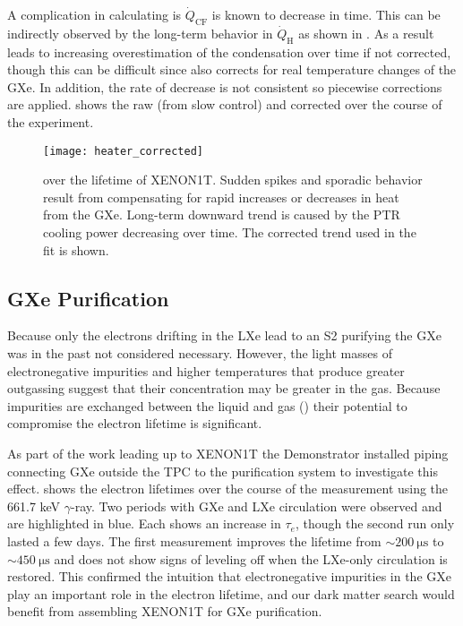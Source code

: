 A complication in calculating \qdg is $\dot{Q}_{\mathrm{CF}}$ is known to decrease in time.  This can be indirectly observed by
the long-term behavior in $\dot{Q}_{\mathrm{H}}$ as shown in .  As a result
 leads to increasing overestimation of the condensation over time if not
corrected, though this can be difficult since \qdh also corrects for real temperature changes of the
GXe.  In addition, the rate of decrease is not consistent so piecewise corrections are
applied.   shows the raw (from slow control) and corrected \qdh over the course of
the experiment.

\begin{figure}
\centering
\texttt{[image: heater\_corrected]}
\caption{\qdh over the lifetime of XENON1T.  Sudden spikes and sporadic behavior result from compensating for rapid increases or decreases
in heat from the GXe.  Long-term downward trend is caused by the PTR cooling power decreasing over time.  The corrected trend
used in the fit is shown.}
\label{fig:electron_lifetime_model_vap_and_cond_heater_all}
\end{figure}



\subsection{GXe Purification}
\label{subsec:electron_lifetime_model_gxe}
Because only the electrons drifting in the LXe lead to an S2 purifying the GXe was in the past not considered necessary.  However,
the light masses of electronegative impurities and higher temperatures that produce greater outgassing
suggest that their concentration may be greater in the gas.  Because
impurities are exchanged between the liquid and gas () their potential to compromise
the electron lifetime is significant.

As part of the work leading up to XENON1T the Demonstrator installed piping connecting GXe outside the TPC to the
purification system to investigate this effect.   shows the electron lifetimes over
the course of the measurement using the 661.7 keV  $\gamma$-ray.  Two periods with GXe and LXe circulation were observed and
are highlighted in blue.  Each shows an increase in
$\tau_e$, though the second run only lasted a few days.  The first measurement improves the lifetime from
${\sim} 200\ \mathrm{\mu s}$ to ${\sim} 450\ \mathrm{\mu s}$ and does not show signs of leveling off when the LXe-only circulation is
restored.  This confirmed the intuition that electronegative impurities in the GXe play an important role in the electron
lifetime, and our dark matter search would benefit from assembling XENON1T for GXe purification.

